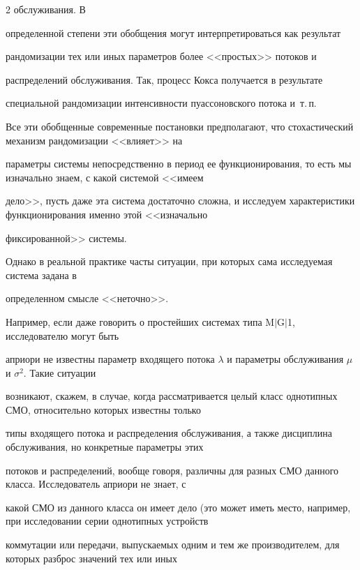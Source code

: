 \begin{multicols}{2}
обслу\-жи\-ва\-ния. В 


определенной степени эти обобщения могут интерпретироваться как результат 


рандомизации тех или иных параметров более <<прос\-тых>> потоков и 


распределений обслуживания. Так, процесс Кокса получается в результате 


специальной рандомизации интенсивности пуассоновского потока и~т.\,п.





Все эти обобщенные современные постановки предполагают, что стохастический механизм рандомизации <<влияет>> на


параметры системы непосредственно в период ее функционирования, то есть мы изначально знаем, с какой системой <<имеем


дело>>, пусть даже эта система достаточно сложна, и исследуем характеристики функционирования именно этой <<изначально


фиксированной>> системы. 





Однако в реальной практике часты ситуации, при которых сама исследуемая система задана в


определенном смысле <<неточно>>. 





Например, если даже говорить о простейших системах типа M$\vert$G$\vert$1, исследователю могут быть


априори не известны параметр входящего потока $\lambda$ и параметры обслуживания $\mu$ и $\sigma^2$. Такие ситуации


возникают, скажем, в случае, когда рассматривается целый класс однотипных СМО, относительно которых известны только


типы входящего потока и распределения обслуживания, а также дисциплина обслуживания, но конкретные параметры этих


потоков и распределений, вообще говоря, различны для разных СМО данного класса. Исследователь априори не знает, с


какой СМО из данного класса он имеет дело (это может иметь место, например, при исследовании серии однотипных устройств


коммутации или передачи, выпускаемых одним и тем же производителем, для которых разброс значений тех или иных



\end{multicols}
